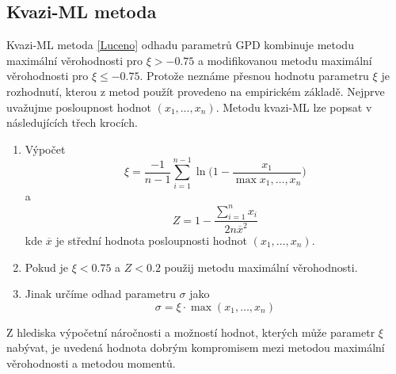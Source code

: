 \subsection{Kvazi-ML metoda}
Kvazi-ML metoda \ref{Luceno} odhadu parametrů GPD kombinuje metodu maximální věrohodnosti pro $\xi > -0.75$ a modifikovanou metodu maximální věrohodnosti pro $\xi \leq -0.75$. Protože neznáme přesnou hodnotu parametru $\xi$ je rozhodnutí, kterou z metod použít provedeno na empirickém základě. Nejprve uvažujme posloupnost hodnot $(x_1,\dots, x_n)$. Metodu kvazi-ML lze popsat v následujících třech krocích.
\begin{enumerate}
\item Výpočet
\begin{equation}
\xi=\frac{-1}{n-1}\sum_{i=1}^{n-1} \ln \Big(1-\frac{x_1}{\max{x_1,\dots,x_n}}\Big)
\end{equation}
a
\begin{equation}
Z=1-\frac{\sum_{i=1}^n x_i}{2 n\overline{x}^2}
\end{equation}
kde $\overline{x}$ je střední hodnota posloupnosti hodnot $(x_1,\dots, x_n)$.
\item Pokud je $\xi<0.75$ a  $Z < 0.2$ použij metodu maximální věrohodnosti. 
\item Jinak určíme odhad parametru $\sigma$ jako
\begin{equation}
\sigma=\xi \cdot \max{(x_1,\dots,x_n)}
\end{equation}

\end{enumerate}
Z hlediska výpočetní náročnosti a možností hodnot, kterých může parametr $\xi$ nabývat, je uvedená hodnota dobrým kompromisem mezi metodou maximální věrohodnosti a metodou momentů.
